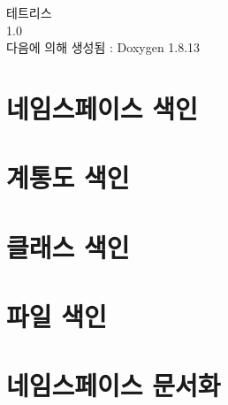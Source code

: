 \documentclass[twoside]{book}
\newcommand{\+}{\discretionary{\mbox{\scriptsize$\hookleftarrow$}}{}{}}
\newcommand{\clearemptydoublepage}{%
  \newpage{\pagestyle{empty}\cleardoublepage}%
}
\begin{document}
\hypersetup{pageanchor=false,
             bookmarksnumbered=true,
             pdfencoding=unicode
            }
\begin{titlepage}
\vspace*{7cm}
\begin{center}%
{\Large 테트리스 \\[1ex]\large 1.\+0 }\\
\vspace*{1cm}
{\large 다음에 의해 생성됨 \+:  Doxygen 1.8.13}\\
\end{center}
\end{titlepage}
\clearemptydoublepage
{}
\tableofcontents
\clearemptydoublepage
{}
\hypersetup{pageanchor=true}

\chapter{네임스페이스 색인}

\chapter{계통도 색인}

\chapter{클래스 색인}

\chapter{파일 색인}

\chapter{네임스페이스 문서화}

















\end{document}
